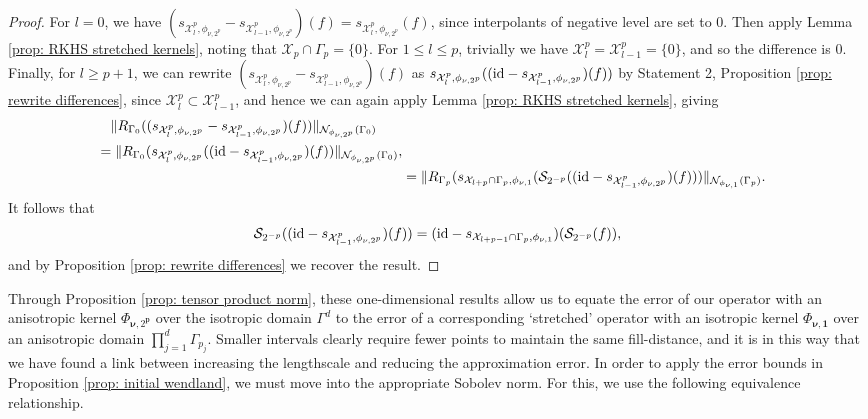 \documentclass[pdflatex,sn-mathphys-num]{sn-jnl}%
\theoremstyle{thmstyleone}%
\theoremstyle{thmstyletwo}%
\theoremstyle{thmstylethree}%
\begin{document}
\begin{proof}
    For \(l=0\), we have \((s_{\mathcal{X}^{p}_{l},\phi_{\nu,2^{p}}}-s_{\mathcal{X}^{p}_{l-1},\phi_{\nu,2^{p}}})(f) = s_{\mathcal{X}^{p}_{l},\phi_{\nu,2^{p}}}(f)\), since interpolants of negative level are set to 0. Then apply Lemma \ref{prop: RKHS stretched kernels}, noting that \(\mathcal{X}_{p}\cap\Gamma_p =\{0\}\). For \(1\leq l\leq p\), trivially we have \(\mathcal{X}_l^p=\mathcal{X}^p_{l-1}=\{0\}\), and so the difference is 0. Finally, for \(l\geq p+1\), we can rewrite \((s_{\mathcal{X}^{p}_{l},\phi_{\nu,2^{p}}}-s_{\mathcal{X}^{p}_{l-1},\phi_{\nu,2^{p}}})(f)\) as \(s_{\mathcal{X}^{p}_{l},\phi_{\nu,2^{p}}} ((\textup{id}-s_{\mathcal{X}^{p}_{l-1},\phi_{\nu,2^{p}}})(f))\) by Statement 2, Proposition \ref{prop: rewrite differences}, since \(\mathcal{X}^p_l\subset\mathcal{X}^p_{l-1}\),
    and hence we can again apply Lemma \ref{prop: RKHS stretched kernels}, giving
    \begin{align}  
        \begin{split}
        &\quad\|R_{\Gamma_0}((s_{\mathcal{X}^{p}_{l},\phi_{\nu,2^{p}}}-s_{\mathcal{X}^{p}_{l-1},\phi_{\nu,2^{p}}})(f))\|_{\mathcal{N}_{\phi_{\nu,2^p}}(\Gamma_0)}\\
        &=\|R_{\Gamma_0}(s_{\mathcal{X}^{p}_{l},\phi_{\nu,2^{p}}} ((\textup{id}-s_{\mathcal{X}^{p}_{l-1},\phi_{\nu,2^{p}}})(f))\|_{\mathcal{N}_{\phi_{\nu,2^p}}(\Gamma_0)},
        \end{split}\nonumber\\
        &=\|R_{\Gamma_p}(s_{\mathcal{X}_{l+p}\cap\Gamma_p,\phi_{\nu,1}} (\mathcal{S}_{2^{-p}}((\textup{id}-s_{\mathcal{X}^{p}_{l-1},\phi_{\nu,2^{p}}})(f)))\|_{\mathcal{N}_{\phi_{\nu,1}}(\Gamma_p)}.\nonumber
    \end{align}
    It follows that
    \[
    \mathcal{S}_{2^{-p}}((\textup{id}-s_{\mathcal{X}^{p}_{l-1},\phi_{\nu,2^{p}}})(f))=(\textup{id}-s_{\mathcal{X}_{l+p-1}\cap\Gamma_p,\phi_{\nu,1}})(\mathcal{S}_{2^{-p}}(f)),
    \]
    and by Proposition \ref{prop: rewrite differences} we recover the result.
\end{proof}
Through Proposition \ref{prop: tensor product norm}, these one-dimensional results allow us to equate the error of our operator with an anisotropic kernel \(\Phi_{\boldsymbol{\nu},2^{\mathbf{p}}}\) over the isotropic domain \(\Gamma^d\) to the error of a corresponding `stretched' operator with an isotropic kernel \(\Phi_{\boldsymbol{\nu}, \mathbf{1}}\) over an anisotropic domain \(\prod_{j=1}^d\Gamma_{p_j}\). Smaller intervals clearly require fewer points to maintain the same fill-distance, and it is in this way that we have found a link between increasing the lengthscale and reducing the approximation error. In order to apply the error bounds in Proposition \ref{prop: initial wendland}, we must move into the appropriate Sobolev norm. For this, we use the following equivalence relationship.
\end{document}
